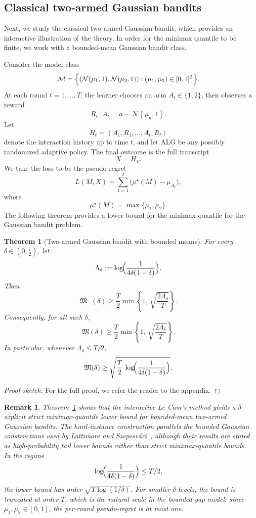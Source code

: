 \documentclass[journal]{IEEEtran}
\newtheorem{theorem}{Theorem}
\newtheorem{remark}{Remark}
\newcommand{\ALG}{\mathrm{ALG}}
\begin{document}
\subsection{Classical two-armed Gaussian bandits}
\label{sec:warmup-bandit}

Next, we study the classical two-armed Gaussian bandit, which provides an
interactive illustration of the theory. In order for the minimax quantile to be
finite, we work with a bounded-mean Gaussian bandit class.

Consider the model class
\[
\mathcal M
=
\Bigl\{
(\mathcal N(\mu_1,1),\mathcal N(\mu_2,1)):
(\mu_1,\mu_2)\in[0,1]^2
\Bigr\}.
\]
At each round \(t=1,\dots,T\), the learner chooses an arm
\(A_t\in\{1,2\}\), then observes a reward
\[
R_t\,|\,A_t=a \sim \mathcal N(\mu_a,1).
\]
Let
\[
H_t=(A_1,R_1,\dots,A_t,R_t)
\]
denote the interaction history up to time \(t\), and let \(\ALG\) be any
possibly randomized adaptive policy. The final outcome is the full transcript
\[
X=H_T.
\]
We take the loss to be the pseudo-regret
\[
L(M,X)
=
\sum_{t=1}^T \bigl(\mu^\star(M)-\mu_{A_t}\bigr),
\]
where
\[
\mu^\star(M)=\max\{\mu_1,\mu_2\}.
\]
The following theorem provides a lower bound for the minimax quantile for the Gaussian bandit problem.  
\begin{theorem}[Two-armed Gaussian bandit with bounded means]
\label{thm:nonprivate-two-arm}
For every \(\delta\in(0,\tfrac12)\), let
\[
\Lambda_\delta
:=
\log\!\Bigl(\frac{1}{4\delta(1-\delta)}\Bigr).
\]
Then
\[
\mathfrak M_-(\delta)
\ge
\frac{T}{2}
\min\!\left\{
1,\,
\sqrt{\frac{2\Lambda_\delta}{T}}
\right\}.
\]
Consequently, for all such \(\delta\),
\[
\mathfrak M(\delta)
\ge
\frac{T}{2}
\min\!\left\{
1,\,
\sqrt{\frac{2\Lambda_\delta}{T}}
\right\}.
\]
In particular, whenever \(\Lambda_\delta\le T/2\),
\[
\mathfrak M(\delta)
\ge
\sqrt{
\frac{T}{2}\,
\log\!\Bigl(\frac{1}{4\delta(1-\delta)}\Bigr)
}.
\]

\end{theorem}
\begin{proof}[Proof sketch]
    For the full proof, we refer the reader to the appendix.
\end{proof}

\begin{remark}
    Theorem~\ref{thm:nonprivate-two-arm} shows that the interactive Le Cam's method
yields a \(\delta\)-explicit strict minimax-quantile lower bound for bounded-mean
two-armed Gaussian bandits. The hard-instance construction parallels the bounded
Gaussian constructions used by Lattimore and Szepesvári~\cite[Chs.~13 and
17]{lattimore2020bandit}, although their results are stated as high-probability
tail lower bounds rather than strict minimax-quantile bounds. In the regime
\[
\log\!\Bigl(\frac{1}{4\delta(1-\delta)}\Bigr)\le T/2,
\]
the lower bound has order \(\sqrt{T\log(1/\delta)}\). For smaller \(\delta\)
levels, the bound is truncated at order \(T\), which is the natural scale in the
bounded-gap model: since \(\mu_1,\mu_2\in[0,1]\), the per-round pseudo-regret is
at most one.
\end{remark}
\end{document}
